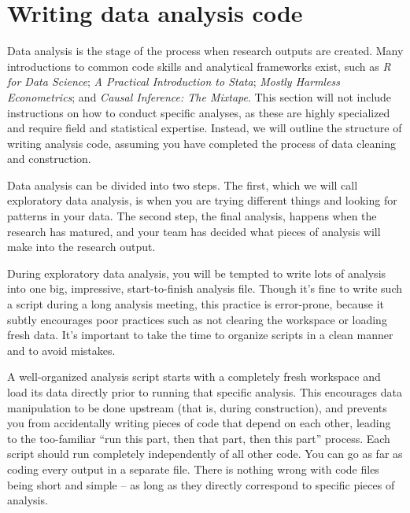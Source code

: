 
\section{Writing data analysis code}

Data analysis is the stage of the process when research outputs are created. 
Many introductions to common code skills and analytical frameworks exist, such as
\textit{R for Data Science};
\textit{A Practical Introduction to Stata};
\textit{Mostly Harmless Econometrics}; and
\textit{Causal Inference: The Mixtape}.
This section will not include instructions on how to conduct specific analyses,
as these are highly specialized and require field and statistical expertise.
Instead, we will outline the structure of writing analysis code,
assuming you have completed the process of data cleaning and construction.

Data analysis can be divided into two steps. 
The first, which we will call exploratory data analysis, 
is when you are trying different things and looking for patterns in your data. 
The second step, the final analysis,
happens when the research has matured,
and your team has decided what pieces of analysis will make into the research output.

During exploratory data analysis,
you will be tempted to write lots of analysis 
into one big, impressive, start-to-finish analysis file. 
Though it's fine to write such a script during a long analysis meeting, 
this practice is error-prone, 
because it subtly encourages poor practices such as 
not clearing the workspace or loading fresh data. 
It's important to take the time to organize scripts in a clean manner and to avoid mistakes.

A well-organized analysis script starts with 
a completely fresh workspace and load its data directly
prior to running that specific analysis.
This encourages data manipulation to be done upstream (that is, during construction),
and prevents you from accidentally writing pieces of code
that depend on each other, leading to the too-familiar
``run this part, then that part, then this part'' process.
Each script should run completely independently of all other code.
You can go as far as coding every output in a separate file.
There is nothing wrong with code files being short and simple --
as long as they directly correspond to specific pieces of analysis.

